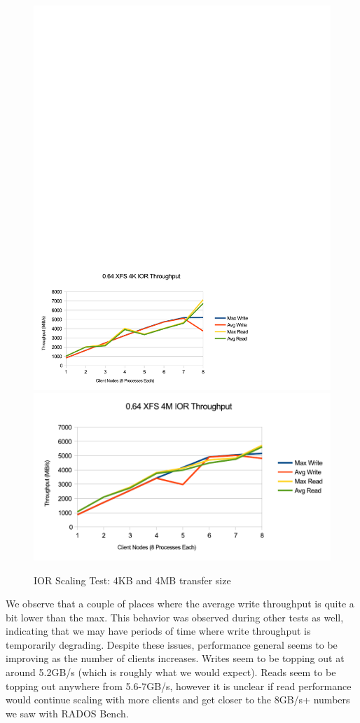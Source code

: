 \documentclass{article}
\begin{document}
\begin{figure}[htb]
\centering
\includegraphics[width=5in]{ior-064-4k}
\includegraphics[width=5in]{ior-064-4m}
\caption{IOR Scaling Test: 4KB and 4MB transfer size}
\label{fig:ior-064}
\end{figure}

We observe that a couple of places where the average write throughput is quite a
bit lower than the max.  This behavior was observed during other tests as well,
indicating that we may have periods of time where write throughput is
temporarily degrading.  Despite these issues, performance general seems to be
improving as the number of clients increases.  Writes seem to be topping out at
around 5.2GB/s (which is roughly what we would expect).  Reads seem to be
topping out anywhere from 5.6-7GB/s, however it is unclear if read performance
would continue scaling with more clients and get closer to the 8GB/s+ numbers we
saw with RADOS Bench.
\end{document}
